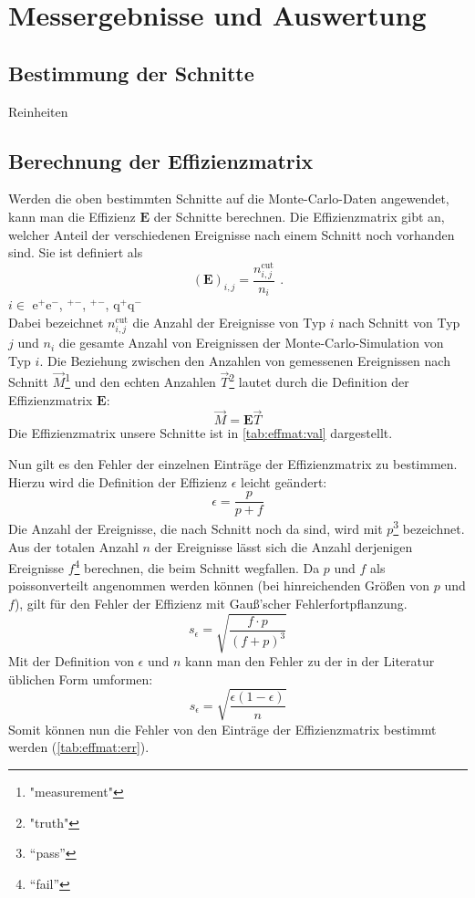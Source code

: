 \section{Messergebnisse und Auswertung}
\subsection{Bestimmung der Schnitte}
Reinheiten
\subsection{Berechnung der Effizienzmatrix}
Werden die oben bestimmten Schnitte auf die Monte-Carlo-Daten angewendet, kann man die Effizienz $\bm{E}$ der Schnitte berechnen. 
Die Effizienzmatrix gibt an, welcher Anteil der verschiedenen Ereignisse nach einem Schnitt noch vorhanden sind. Sie ist definiert als 
\begin{equation}
    \left( \bm{E} \right)_{i,j} = \frac{n_{i, j}^\text{cut}}{n_i} \ \, .
\end{equation} 
$i \in $ e$^+$e$^-$, \textmu$^+$\textmu$^-$, \texttau$^+$\texttau$^-$, q$^+$q$^-$ \\  %
Dabei bezeichnet $n_{i, j}^\text{cut}$ die Anzahl der Ereignisse von Typ $i$ nach Schnitt von Typ $j$ und $n_i$ die gesamte Anzahl von Ereignissen 
der Monte-Carlo-Simulation von Typ $i$. 
Die Beziehung zwischen den Anzahlen von gemessenen Ereignissen nach Schnitt $\vec{M}$\footnote{"measurement"} und den echten Anzahlen 
$\vec{T}$\footnote{"truth"} lautet durch die Definition der Effizienzmatrix $\bm{E}$:
\begin{equation}
    \label{eq:effmat:mtrel}
    \vec{M} = \bm{E} \vec{T}
\end{equation}
Die Effizienzmatrix unsere Schnitte ist in \autoref{tab:effmat:val} dargestellt.

Nun gilt es den Fehler der einzelnen Einträge der Effizienzmatrix zu bestimmen. Hierzu wird die Definition der Effizienz $\epsilon$ leicht geändert:
\begin{equation}
    \epsilon = \frac{p}{p+f}	
\end{equation}
Die Anzahl der Ereignisse, die nach Schnitt noch da sind, wird mit $p$\footnote{"`pass"'} bezeichnet. Aus der totalen Anzahl $n$ der Ereignisse lässt 
sich die Anzahl derjenigen Ereignisse $f$\footnote{"`fail"'} berechnen, die beim Schnitt wegfallen. Da $p$ und $f$ als poissonverteilt angenommen 
werden können (bei hinreichenden Größen von $p$ und $f$), gilt für den Fehler der Effizienz mit Gauß'scher Fehlerfortpflanzung.
\begin{equation}
    s_\epsilon = \sqrt{\frac{f \cdot p}{ \left( f + p \right)^3}}
\end{equation}
Mit der Definition von $\epsilon$ und $n$ kann man den Fehler zu der in der Literatur üblichen Form umformen:
\begin{equation}
    s_\epsilon = \sqrt{\frac{\epsilon (1-\epsilon)}{n}}
\end{equation}
Somit können nun die Fehler von den Einträge der Effizienzmatrix bestimmt werden (\autoref{tab:effmat:err}).

